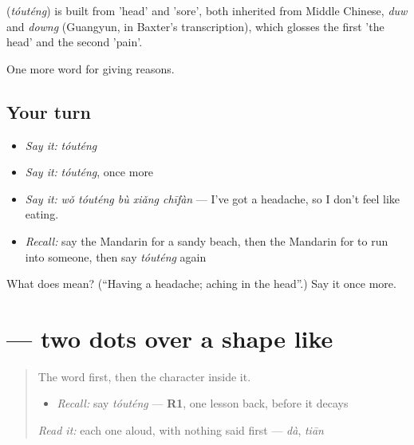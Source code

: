 \begin{cousinweb}
\textbf{} (\emph{tóuténg}) is built from  'head' and  'sore', both inherited from Middle Chinese, \emph{duw} and \emph{downg} (Guangyun, in Baxter's transcription), which glosses the first 'the head' and the second 'pain'.
\end{cousinweb}

\begin{grammarlens}[title={What you've built}]
One more word for giving reasons.
\end{grammarlens}

\subsection*{Your turn}
\begin{itemize}
\raggedright
  \item \emph{Say it:} \emph{tóuténg}
  \item \emph{Say it:} \emph{tóuténg}, once more
  \item \emph{Say it:} \emph{wǒ tóuténg bù xiǎng chīfàn} — I've got a headache, so I don't feel like eating.
  \item \emph{Recall:} say the Mandarin for a sandy beach, then the Mandarin for to run into someone, then say \emph{tóuténg} again
\end{itemize}

\begin{tcolorbox}[breakable,colback=teal!4,colframe=teal!35!black,title={Before you move on}]
What does  mean? (\textquotedblleft{}Having a headache; aching in the head\textquotedblright{}.) Say it once more.
\end{tcolorbox}
\section[\texorpdfstring{\zh{头} (tóu)}{头 (tóu)}]{ — two dots over a shape like }

\label{lesson:ZH-W228-tou-head}



\begin{quote}
The word first, then the character inside it.

\begin{itemize}
\raggedright
  \item \emph{Recall:} say \emph{tóuténg} — \textbf{R1}, one lesson back, before it decays
\end{itemize}

\begin{quote}
 
\end{quote}

\emph{Read it:} each one aloud, with nothing said first — \emph{dà}, \emph{tiān}
\end{quote}

